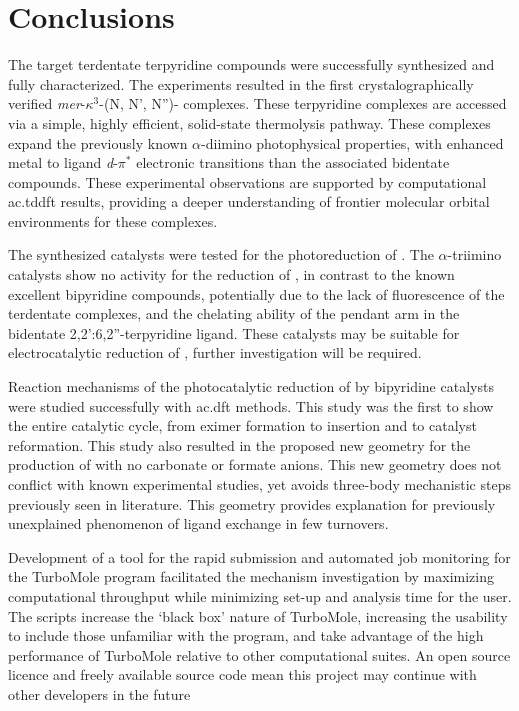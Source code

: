 \chapter{Conclusions}

The target  terdentate terpyridine compounds were successfully synthesized and fully characterized. The experiments resulted in the first crystalographically verified \textit{mer}-$\kappa^3$-(N, N', N'')- complexes. These terpyridine complexes are accessed via a simple, highly efficient, solid-state thermolysis pathway. These complexes expand the previously known $\alpha$-diimino photophysical properties, with enhanced metal to ligand \textit{d}-$\pi^\ast$ electronic transitions than the associated bidentate compounds. These experimental observations are supported by computational \gls{ac.tddft} results, providing  a deeper understanding of frontier molecular orbital environments for these complexes. 

The synthesized catalysts were tested for the photoreduction of . The $\alpha$-triimino catalysts show no activity for the reduction of , in contrast to the known excellent bipyridine compounds, potentially due to the lack of fluorescence of the terdentate complexes, and the chelating ability of the pendant arm in the bidentate 2,2':6,2''-terpyridine ligand. These catalysts may be suitable for electrocatalytic reduction of , further investigation will be required.

Reaction mechanisms of the photocatalytic reduction of  by bipyridine catalysts were studied successfully with \gls{ac.dft} methods. This study was the first to show the entire catalytic cycle, from eximer formation to  insertion and to catalyst reformation. This study also resulted  in the proposed new geometry for the production of  with no carbonate or formate anions. This new geometry does not conflict with known experimental studies, yet avoids three-body mechanistic steps previously seen in literature. This geometry provides explanation for previously unexplained phenomenon of  ligand exchange in few turnovers.

Development of a tool for the rapid submission and automated job monitoring for the TurboMole program facilitated the mechanism investigation by maximizing computational throughput while minimizing set-up and analysis time for the user. The scripts increase the `black box' nature of TurboMole, increasing the usability to include those unfamiliar with the program, and take advantage of the high performance of TurboMole relative to other computational suites. An open source licence and freely available source code mean this project may continue with other developers in the future




